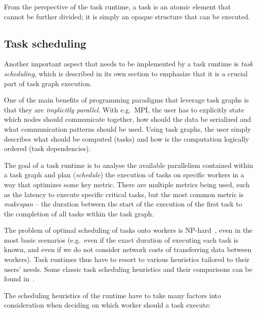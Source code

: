 From the perspective of the task runtime, a task is an atomic element that cannot be further
divided; it is simply an opaque structure that can be executed.

\subsection{Task scheduling}
Another important aspect that needs to be implemented by a task runtime is \emph{task
scheduling}, which is described in its own section to emphasize that it is a crucial part of
task graph execution.

One of the main benefits of programming paradigms that leverage task graphs is that they are
\emph{implicitly parallel}. With e.g.\ MPI, the user has to explicitly state which nodes should
communicate together, how should the data be serialized and what communication patterns should
be used. Using task graphs, the user simply describes what should be computed (tasks) and how is
the computation logically ordered (task dependencies).

The goal of a task runtime is to analyse the available parallelism contained within a task graph
and plan (\emph{schedule}) the execution of tasks on specific workers in a way that
optimizes some key metric. There are multiple metrics being used, such as the latency to execute
specific critical tasks, but the most common metric is \emph{makespan} -- the duration between the
start of the execution of the first task to the completion of all tasks within the task graph.

The problem of optimal scheduling of tasks onto workers is NP-hard~\cite{Ullman1975}, even in
the most basic scenarios (e.g.\ even if the exact duration of executing each task is known,
and even if we do not consider network costs of transferring data between workers). Task
runtimes thus have to resort to various heuristics tailored to their users' needs. Some classic
task scheduling heuristics and their comparisons can be found
in~\cite{hlfet1974,kwok1998benchmarking,hagras2003static,wang2018list,estee}.

The scheduling heuristics of the runtime have to take many factors into consideration when
deciding on which worker should a task execute:

